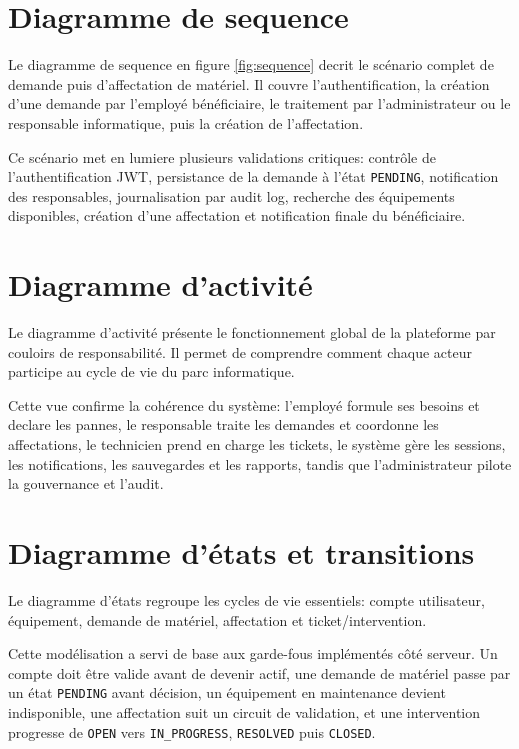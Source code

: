 \section{Diagramme de sequence}
Le diagramme de sequence en figure \ref{fig:sequence} decrit le scénario complet de demande puis d'affectation de matériel. Il couvre l'authentification, la création d'une demande par l'employé bénéficiaire, le traitement par l'administrateur ou le responsable informatique, puis la création de l'affectation.


Ce scénario met en lumiere plusieurs validations critiques: contrôle de l'authentification JWT, persistance de la demande à l'état \texttt{PENDING}, notification des responsables, journalisation par audit log, recherche des équipements disponibles, création d'une affectation et notification finale du bénéficiaire.

\section{Diagramme d'activité}
Le diagramme d'activité présente le fonctionnement global de la plateforme par couloirs de responsabilité. Il permet de comprendre comment chaque acteur participe au cycle de vie du parc informatique.


Cette vue confirme la cohérence du système: l'employé formule ses besoins et declare les pannes, le responsable traite les demandes et coordonne les affectations, le technicien prend en charge les tickets, le système gère les sessions, les notifications, les sauvegardes et les rapports, tandis que l'administrateur pilote la gouvernance et l'audit.

\section{Diagramme d'états et transitions}
Le diagramme d'états regroupe les cycles de vie essentiels: compte utilisateur, équipement, demande de matériel, affectation et ticket/intervention.


Cette modélisation a servi de base aux garde-fous implémentés côté serveur. Un compte doit être valide avant de devenir actif, une demande de matériel passe par un état \texttt{PENDING} avant décision, un équipement en maintenance devient indisponible, une affectation suit un circuit de validation, et une intervention progresse de \texttt{OPEN} vers \texttt{IN\_PROGRESS}, \texttt{RESOLVED} puis \texttt{CLOSED}.

